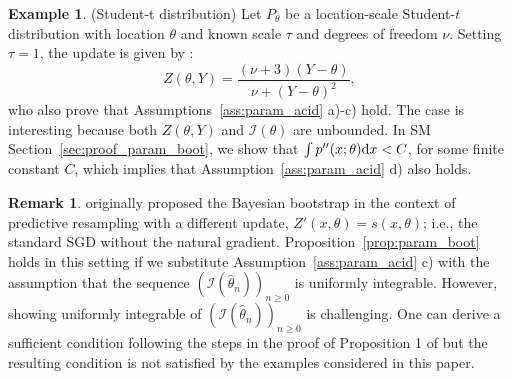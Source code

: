 \documentclass{article}
\theoremstyle{definition}
\newtheorem{example}{Example}
\newtheorem{remark}{Remark}
\newcommand{\di}{{\rm d}}
\renewcommand{\&}{and}
\begin{document}
\begin{example}\label{ex:studentt}(Student-t distribution)  Let $P_{\theta}$ be a location-scale Student-$t$ distribution with location $\theta$ and known scale $\tau$ and degrees of freedom $\nu$.%
Setting \( \tau = 1 \), the update is given by \cite{fong2024asymptotics}: 
\[
Z(\theta,Y) = \frac{(\nu +3)(Y-\theta)}{\nu +(Y-\theta)^2},
\]
who also prove that Assumptions~\ref{ass:param_acid} a)-c) hold. The case is interesting because both $Z(\theta,Y)$ and $\mathcal{I}(\theta)$ are unbounded. 
In SM Section~\ref{sec:proof_param_boot}, we show that $\int p''(x;\theta) \di x <C$, for some finite constant $C$, which implies that Assumption~\ref{ass:param_acid} d) also holds.
\end{example}

\begin{remark} \cite{holmes2023statistical} originally proposed the Bayesian bootstrap in the context of predictive resampling with a different update, $Z'(x,\theta)=s(x,\theta)$; i.e., the standard SGD without the natural gradient. Proposition~\ref{prop:param_boot} holds in this setting if we substitute Assumption~\ref{ass:param_acid} c) with the assumption that the sequence $(\mathcal{I}(\hat{\theta}_n))_{n \geq 0}$ is uniformly integrable. 
However, showing uniformly integrable of $(\mathcal{I}(\hat{\theta}_n))_{n \geq 0}$ is challenging. One can derive a sufficient condition following the steps in the proof of  %
Proposition 1 of \cite{fong2024asymptotics} but the resulting condition is not satisfied by the examples considered in this paper.  %
\end{remark}
\end{document}
